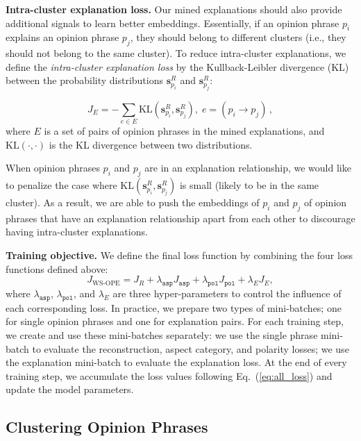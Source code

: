 \smallskip
\noindent \textbf{Intra-cluster explanation loss.} Our mined explanations should also provide additional signals to learn better embeddings. Essentially, if an opinion phrase $p_i$ explains an opinion phrase $p_j$, they should belong to different clusters (i.e., they should not belong to the same cluster).
%
To reduce intra-cluster explanations, we define the \textsl{intra-cluster explanation loss} by the Kullback-Leibler divergence (KL) between the probability distributions $\mathbf{s}^R_{p_i}  $ and $\mathbf{s}^R_{p_j}$:

\begin{equation}
J_{E} = -\sum_{e \in E} \mathrm{KL}(\mathbf{s}^R_{p_i}, \mathbf{s}^R_{p_j}), \; e=(p_i\rightarrow p_j)\,,
\end{equation}
%
where $E$ is a set of pairs of opinion phrases in the mined explanations,
and $\mathrm{KL}(\cdot,\cdot)$ is the KL divergence between two distributions.

When opinion phrases $p_i$ and $p_j$ are in an explanation relationship, we would like to penalize the case where $\mathrm{KL}(\mathbf{s}^R_{p_i}, \mathbf{s}^R_{p_j})$ is small (likely to be in the same cluster).
As a result, we are able to push the embeddings of $p_i$ and $p_j$ of opinion phrases that have an explanation relationship apart from each other to discourage having intra-cluster explanations.

\smallskip
\noindent \textbf{Training objective.} We define the final loss function by combining the four loss functions defined above:
\begin{equation}\label{eq:all_loss}
J_{\text{WS-OPE}} = J_R + \lambda_\mathtt{asp} J_\mathtt{asp} + \lambda_\mathtt{pol} J_\mathtt{pol} + \lambda_E J_E,
\end{equation}
\noindent
where $\lambda_\mathtt{asp}$, $\lambda_\mathtt{pol}$, and $\lambda_E$ are three hyper-parameters to control the influence of each corresponding loss. 
%
In practice, we prepare two types of mini-batches; one for single opinion phrases and one for explanation pairs. For each training step, we create and use these mini-batches separately: we use the single phrase mini-batch to evaluate the reconstruction, aspect category, and polarity losses; we use the explanation mini-batch to evaluate the explanation loss. At the end of every training step, we accumulate the loss values following Eq.~(\ref{eq:all_loss}) and update the model parameters. 


\smallskip
\subsection{Clustering Opinion Phrases}

